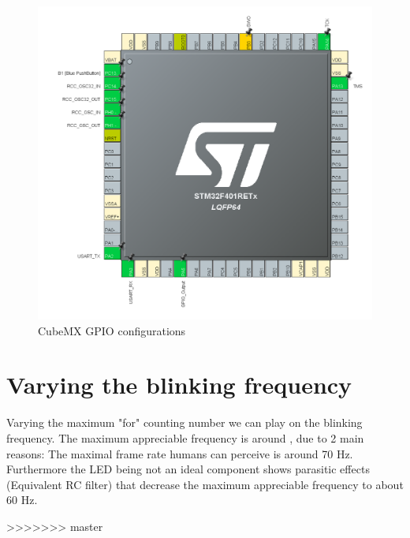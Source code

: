 \documentclass[12pt]{article}
\begin{document}
	\begin{figure}[!h]
		\centering
		\includegraphics[scale = 0.7]{immagini/1_2.png}
		\caption{CubeMX GPIO configurations}
	\end{figure}

\section{Varying the blinking frequency}

Varying the maximum "for" counting number we can play on the blinking frequency.
The maximum appreciable frequency is around , due to 2 main reasons:
The maximal frame rate humans can perceive is around 70 Hz. Furthermore the LED being not an ideal component shows parasitic effects (Equivalent RC filter) that decrease the maximum appreciable frequency to about 60 Hz. 




>>>>>>> master
\end{document}

